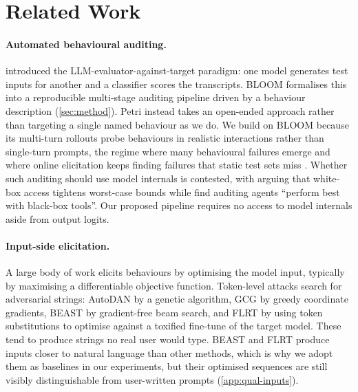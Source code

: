 \documentclass{article}
\theoremstyle{plain}
\theoremstyle{definition}
\theoremstyle{remark}
\begin{document}
\section{Related Work}\label{sec:related}

\paragraph{Automated behavioural auditing.}
\citet{perez2022redteaming} introduced the LLM-evaluator-against-target paradigm: one model generates test inputs for another and a classifier scores the transcripts.
BLOOM \citep{gupta2025bloom} formalises this into a reproducible multi-stage auditing pipeline driven by a behaviour description (\cref{sec:method}).
Petri \citep{fronsdal2025petri} instead takes an open-ended approach rather than targeting a single named behaviour as we do.
We build on BLOOM because its multi-turn rollouts probe behaviours in realistic interactions rather than single-turn prompts, the regime where many behavioural failures emerge \citep{russinovich2024crescendo} and where online elicitation keeps finding failures that static test sets miss \citep{huang2025multiturn}.
Whether such auditing should use model internals is contested, with \citet{casper2024blackbox} arguing that white-box access tightens worst-case bounds while \citet{sheshadri2026auditbench} find auditing agents ``perform best with black-box tools''. Our proposed pipeline requires no access to model internals aside from output logits.


\paragraph{Input-side elicitation.}
A large body of work elicits behaviours by optimising the model input, typically by maximising a differentiable objective function.
Token-level attacks search for adversarial strings: AutoDAN \citep{liu2023autodan} by a genetic algorithm, GCG \citep{zou2023universal} by greedy coordinate gradients, BEAST \citep{sadasivan2024fast} by gradient-free beam search, and FLRT \citep{thompson2024flrt} by using token substitutions to optimise against a toxified fine-tune of the target model.
These tend to produce strings no real user would type. 
BEAST and FLRT produce inputs closer to natural language than other methods, which is why we adopt them as baselines in our experiments, but their optimised sequences are still visibly distinguishable from user-written prompts (\cref{app:qual-inputs}).
\end{document}
